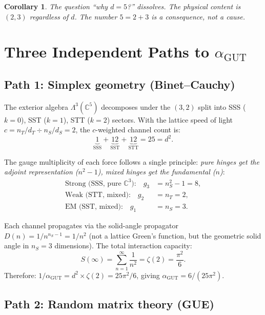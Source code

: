 \documentclass[12pt]{article}
\newtheorem{corollary}[theorem]{Corollary}
\theoremstyle{remark}
\begin{document}
\begin{corollary}
The question ``why $d = 5$?'' dissolves. The physical content is $(2, 3)$ regardless of $d$. The number $5 = 2 + 3$ is a consequence, not a cause.
\end{corollary}

\section{Three Independent Paths to $\alpha_\text{GUT}$}

\subsection{Path 1: Simplex geometry (Binet--Cauchy)}

The exterior algebra $\Lambda^3(\mathbb{C}^5)$ decomposes under the $(3,2)$ split into SSS ($k=0$), SST ($k=1$), STT ($k=2$) sectors. With the lattice speed of light $c = n_T/d_T \div n_S/d_S = 2$, the $c$-weighted channel count is:
\begin{equation}
\underbrace{1}_{\text{SSS}} + \underbrace{12}_{\text{SST}} + \underbrace{12}_{\text{STT}} = 25 = d^2.
\end{equation}

The gauge multiplicity of each force follows a single principle: \emph{pure hinges get the adjoint representation ($n^2-1$), mixed hinges get the fundamental ($n$)}:
\begin{align}
\text{Strong (SSS, pure } \mathbb{C}^3\text{):} \quad g_3 &= n_S^2 - 1 = 8, \\
\text{Weak (STT, mixed):} \quad g_2 &= n_T = 2, \\
\text{EM (SST, mixed):} \quad g_1 &= n_S = 3.
\end{align}

Each channel propagates via the solid-angle propagator $D(n) = 1/n^{n_S-1} = 1/n^2$ (not a lattice Green's function, but the geometric solid angle in $n_S = 3$ dimensions). The total interaction capacity:
\begin{equation}
S(\infty) = \sum_{n=1}^{\infty} \frac{1}{n^2} = \zeta(2) = \frac{\pi^2}{6}.
\end{equation}
Therefore: $1/\alpha_\text{GUT} = d^2 \times \zeta(2) = 25\pi^2/6$, giving $\alpha_\text{GUT} = 6/(25\pi^2)$.

\subsection{Path 2: Random matrix theory (GUE)}
\end{document}
